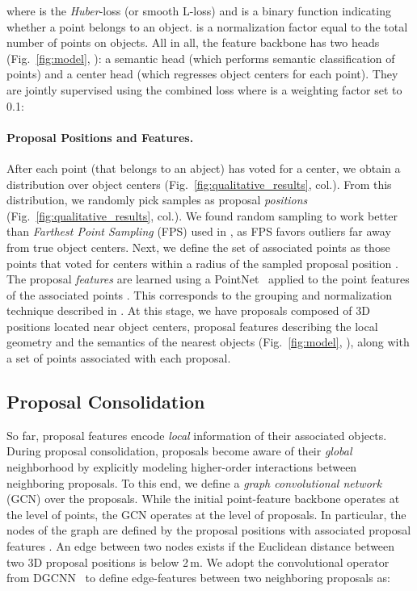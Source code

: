 \documentclass[10pt,twocolumn,letterpaper]{article}
\newcommand{\reffig}[1]{Fig.~\ref{fig:#1}}
\newcommand{\colorsquare}[1]{{\color{#1}}\hspace{-7.78pt}}
\newcommand{\parag}[1]{\vspace{0px}\paragraph{#1}\hspace{-9pt}}
\begin{document}
where  is the \emph{Huber}-loss (or smooth L-loss) and  is a binary function indicating whether a point  belongs to an object.  is a normalization factor equal to the total number of points on objects.
All in all, the feature backbone has two heads (\reffig{model}, \colorsquare{m_orange}): a semantic head (which performs semantic classification of points) and a center head (which regresses object centers for each point). They are jointly supervised using the combined loss   where  is a weighting factor set to 0.1:


\vspace{-15px}
\parag{Proposal Positions and Features.}
After each point (that belongs to an abject) has voted for a center,
we obtain a distribution over object centers (\reffig{qualitative_results},  col.).
From this distribution, we randomly pick  samples as proposal \emph{positions}  (\reffig{qualitative_results},   col.).
We found random sampling to work better than \emph{Farthest Point Sampling} (FPS) used in \cite{Qi19ICCV},
as FPS favors outliers far away from true object centers.
Next, we define the set of associated points   as those points that voted for centers within a radius  of the sampled proposal position .
The proposal \emph{features}  are learned using a PointNet~\cite{Qi17CVPR} applied to the point features
of the associated points .
This corresponds to the grouping and normalization technique described in \cite{Qi19ICCV}.
At this stage, we have  proposals composed of 3D positions  located near object centers, proposal features  describing the local geometry and the semantics of the nearest objects (\reffig{model}, \colorsquare{m_red}), along with a set of points  associated with each proposal.

\subsection{Proposal Consolidation}
\label{sec:proposal_consolidation}
\vspace{-5px}
So far, proposal features encode \emph{local} information of their associated objects.
During proposal consolidation, proposals become aware of their \emph{global} neighborhood by explicitly modeling higher-order interactions between neighboring proposals.
To this end, we define a \emph{graph convolutional network} (GCN) over the proposals.
While the initial point-feature backbone operates at the level of points, the GCN operates at the level of proposals.
In particular, the nodes of the graph are defined by the proposal positions  with associated proposal features .
An edge between two nodes exists if the Euclidean distance  between two 3D proposal positions  is below 2\,m.
We adopt the convolutional operator from DGCNN~\cite{Wang18CoRR} to define edge-features  between two neighboring proposals as:
\end{document}
